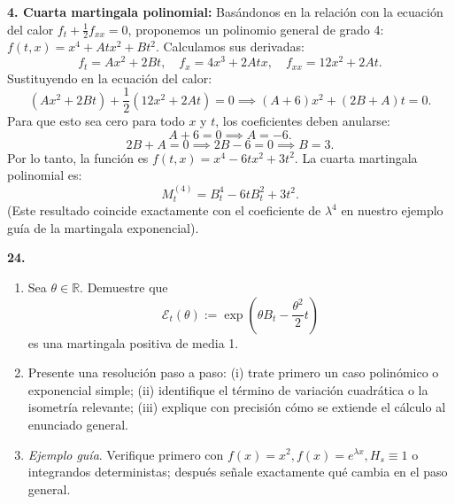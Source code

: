 \documentclass[11pt, letterpaper]{article}
\begin{document}
\begin{solucion}
    \textbf{4. Cuarta martingala polinomial:}
    Basándonos en la relación con la ecuación del calor $f_t + \frac{1}{2}f_{xx} = 0$, proponemos un polinomio general de grado 4: $f(t,x) = x^4 + A t x^2 + B t^2$.
    Calculamos sus derivadas:
    $$ f_t = A x^2 + 2Bt, \quad f_x = 4x^3 + 2Atx, \quad f_{xx} = 12x^2 + 2At. $$
    Sustituyendo en la ecuación del calor:
    $$ (A x^2 + 2Bt) + \frac{1}{2}(12x^2 + 2At) = 0 \implies (A + 6)x^2 + (2B + A)t = 0. $$
    Para que esto sea cero para todo $x$ y $t$, los coeficientes deben anularse:
    $$ A + 6 = 0 \implies A = -6. $$
    $$ 2B + A = 0 \implies 2B - 6 = 0 \implies B = 3. $$
    Por lo tanto, la función es $f(t,x) = x^4 - 6tx^2 + 3t^2$.
    La cuarta martingala polinomial es:
    $$ M_t^{(4)} = B_t^4 - 6tB_t^2 + 3t^2. $$
    (Este resultado coincide exactamente con el coeficiente de $\lambda^4$ en nuestro ejemplo guía de la martingala exponencial).
\end{solucion}

\newpage

\begin{ejercicio}
    \textbf{24.} 
    \begin{enumerate}
        \item Sea $\theta \in \mathbb{R}$. Demuestre que
        \[ \mathcal{E}_t(\theta) := \exp\left(\theta B_t - \frac{\theta^2}{2}t\right) \]
        es una martingala positiva de media 1.
        \item Presente una resolución paso a paso: (i) trate primero un caso polinómico o exponencial simple; (ii) identifique el término de variación cuadrática o la isometría relevante; (iii) explique con precisión cómo se extiende el cálculo al enunciado general.
        \item \textit{Ejemplo guía}. Verifique primero con $f(x) = x^2, f(x) = e^{\lambda x}, H_s \equiv 1$ o integrandos deterministas; después señale exactamente qué cambia en el paso general.
    \end{enumerate}
\end{ejercicio}

\vspace{5mm}
\end{document}
